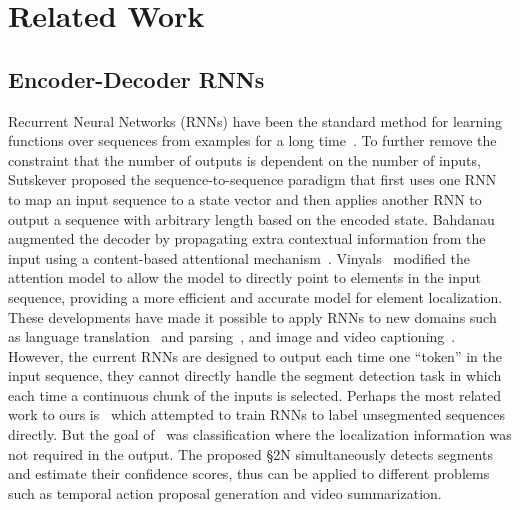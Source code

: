 \documentclass[10pt,journal,compsoc]{IEEEtran}
\begin{document}
\section{Related Work}

\subsection{Encoder-Decoder RNNs}
Recurrent Neural Networks (RNNs) have been the standard method for learning functions over sequences from examples for a long time~\cite{rumelhart1985learning}. To further remove the constraint that the number of outputs is dependent on the number of inputs, Sutskever \etal \cite{sutskever2014sequence}  proposed the sequence-to-sequence paradigm that first uses one RNN to map an input sequence to a state vector and then applies another RNN to output a sequence with arbitrary length based on the encoded state. Bahdanau \etal augmented the decoder by propagating extra contextual information from the input using a content-based attentional mechanism~\cite{bahdanau2014neural,graves2014neural}. Vinyals~\etal \cite{vinyals2015pointer} modified the attention model to allow the model to directly point to elements in the input sequence, providing a more efficient and accurate model for element localization. These developments have made it possible to apply RNNs to new domains such as language translation~\cite{sutskever2014sequence,bahdanau2014neural} and parsing~\cite{vinyals2015grammar}, and image and video captioning~\cite{vinyals2015show,donahue2015long}. However, the current RNNs are designed to output each time one ``token'' in the input sequence,  they cannot directly handle the segment detection task in which each time a continuous chunk of the inputs is selected. Perhaps the most related work to ours is~\cite{graves2006connectionist} which attempted to train RNNs to label unsegmented sequences directly. But the goal of~\cite{graves2006connectionist} was classification where the localization information was not required in the output. The proposed \S2N simultaneously detects segments and estimate their confidence scores, thus can be applied to different problems such as temporal action proposal generation and video summarization.

\end{document}
